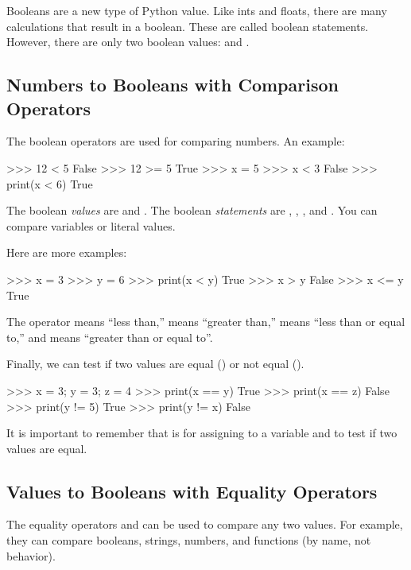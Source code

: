 \documentclass[11pt]{cselabheader}
\begin{document}
Booleans are a new type of Python value. Like ints and floats, there are
many calculations that result in a boolean. These are called boolean
statements. However, there are only two boolean values:
 and .

\subsection{\texorpdfstring%
  {Numbers to Booleans with Comparison Operators \pythoninline{==, !=, <=, <, >, >=}}
  {Numbers to Booleans with Comparison Operators}}

The boolean operators \pythoninline{==, !=, <=, <, >, >=} are used for
comparing numbers. An example:

\begin{pyconcode}
>>> 12 < 5
False
>>> 12 >= 5
True
>>> x = 5
>>> x < 3
False
>>> print(x < 6)
True

\end{pyconcode}

The boolean \textsl{values} are  and
. The boolean \textsl{statements} are ,
, , and .
You can compare variables or literal values.

Here are more examples:

\begin{pyconcode}
>>> x = 3
>>> y = 6
>>> print(x < y)
True
>>> x > y
False
>>> x <= y
True

\end{pyconcode}

The operator
\pythonindex{<} means ``less than,''
\pythonindex{>} means ``greater than,''
\pythonindex{<=} means ``less than or equal to,'' and
\pythonindex{>=} means ``greater than or equal to''.

Finally, we can test if two values are equal
(\pythonindex{==}) or not equal (\pythoninline{!=}).

\begin{pyconcode}
>>> x = 3; y = 3; z = 4
>>> print(x == y)
True
>>> print(x == z)
False
>>> print(y != 5)
True
>>> print(y != x)
False

\end{pyconcode}

It is important to remember that \pythoninline{=} is for assigning to a
variable and \pythoninline{==} to test if two values are equal.


\subsection{Values to Booleans with Equality Operators}
The equality operators \pythoninline{==} and \pythoninline{!=}
can be used to compare any two values. For example, they can compare
booleans, strings, numbers, and functions (by name, not behavior).
\end{document}
